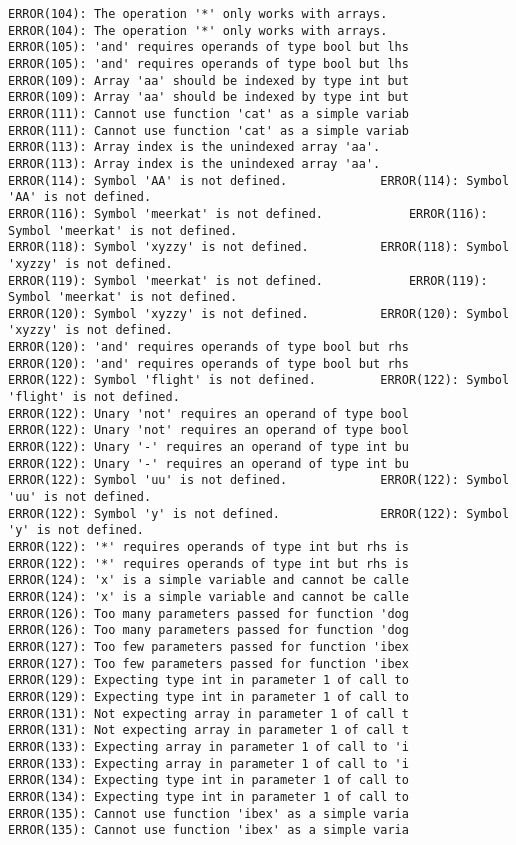 \documentclass[12pt]{book}
\begin{document}
\begin{lstlisting}
ERROR(104): The operation '*' only works with arrays.		ERROR(104): The operation '*' only works with arrays.
ERROR(105): 'and' requires operands of type bool but lhs	ERROR(105): 'and' requires operands of type bool but lhs
ERROR(109): Array 'aa' should be indexed by type int but	ERROR(109): Array 'aa' should be indexed by type int but
ERROR(111): Cannot use function 'cat' as a simple variab	ERROR(111): Cannot use function 'cat' as a simple variab
ERROR(113): Array index is the unindexed array 'aa'.		ERROR(113): Array index is the unindexed array 'aa'.
ERROR(114): Symbol 'AA' is not defined.				ERROR(114): Symbol 'AA' is not defined.
ERROR(116): Symbol 'meerkat' is not defined.			ERROR(116): Symbol 'meerkat' is not defined.
ERROR(118): Symbol 'xyzzy' is not defined.			ERROR(118): Symbol 'xyzzy' is not defined.
ERROR(119): Symbol 'meerkat' is not defined.			ERROR(119): Symbol 'meerkat' is not defined.
ERROR(120): Symbol 'xyzzy' is not defined.			ERROR(120): Symbol 'xyzzy' is not defined.
ERROR(120): 'and' requires operands of type bool but rhs	ERROR(120): 'and' requires operands of type bool but rhs
ERROR(122): Symbol 'flight' is not defined.			ERROR(122): Symbol 'flight' is not defined.
ERROR(122): Unary 'not' requires an operand of type bool	ERROR(122): Unary 'not' requires an operand of type bool
ERROR(122): Unary '-' requires an operand of type int bu	ERROR(122): Unary '-' requires an operand of type int bu
ERROR(122): Symbol 'uu' is not defined.				ERROR(122): Symbol 'uu' is not defined.
ERROR(122): Symbol 'y' is not defined.				ERROR(122): Symbol 'y' is not defined.
ERROR(122): '*' requires operands of type int but rhs is	ERROR(122): '*' requires operands of type int but rhs is
ERROR(124): 'x' is a simple variable and cannot be calle	ERROR(124): 'x' is a simple variable and cannot be calle
ERROR(126): Too many parameters passed for function 'dog	ERROR(126): Too many parameters passed for function 'dog
ERROR(127): Too few parameters passed for function 'ibex	ERROR(127): Too few parameters passed for function 'ibex
ERROR(129): Expecting type int in parameter 1 of call to	ERROR(129): Expecting type int in parameter 1 of call to
ERROR(131): Not expecting array in parameter 1 of call t	ERROR(131): Not expecting array in parameter 1 of call t
ERROR(133): Expecting array in parameter 1 of call to 'i	ERROR(133): Expecting array in parameter 1 of call to 'i
ERROR(134): Expecting type int in parameter 1 of call to	ERROR(134): Expecting type int in parameter 1 of call to
ERROR(135): Cannot use function 'ibex' as a simple varia	ERROR(135): Cannot use function 'ibex' as a simple varia

\end{lstlisting}
\end{document}
